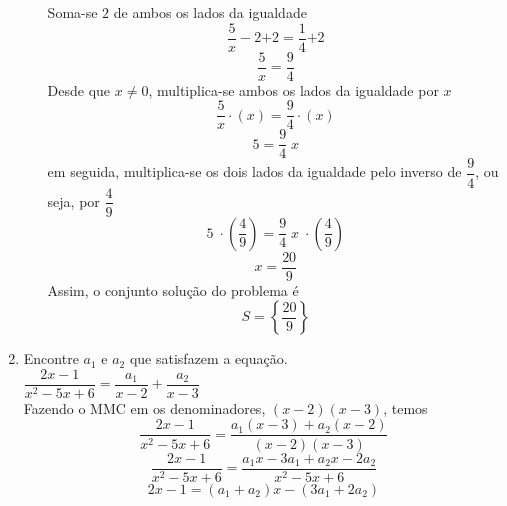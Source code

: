\begin{enumerate}
\begin{enumerate}
   \begin{center}
    \end{center}
			
			Soma-se $2$ de ambos os lados da igualdade
			\[
			\dfrac{5}{x}-2 {+2} = \dfrac{1}{4} {+2}
			\]
			\[
			\dfrac{5}{x} = \dfrac{9}{4}
			\]
			Desde que $x \neq 0$, multiplica-se ambos os lados da igualdade por $x$
			\[
			\dfrac{5}{x} \cdot (x)  = \dfrac{9}{4} \cdot (x)
			\]
			\[
			5= \dfrac{9}{4}\; x
			\]
			em seguida, multiplica-se os dois lados da igualdade pelo inverso de $\dfrac{9}{4}$, ou seja, por $\dfrac{4}{9}$
			\[
			5\; \cdot \left(\dfrac{4}{9}\right)= \dfrac{9}{4}\; x \;\cdot \left(\dfrac{4}{9}\right)
			\]
			\[
			x = \dfrac{20}{9}
			\]
			Assim, o conjunto solução do problema é
			\[
			S=\left\{ \dfrac{20}{9} \right\}
			\]
		\end{enumerate}

		\item Encontre $a_1$ e $a_2$ que satisfazem a equação.\\
		$\dfrac{2x-1}{x^2-5x+6} = \dfrac{a_1}{x-2}+\dfrac{a_2}{x-3}$\\
   
			Fazendo o MMC em os denominadores, $(x-2)(x-3)$, temos
			\[
			\dfrac{2x-1}{x^2-5x+6} = \dfrac{a_1(x-3)+a_2(x-2)}{(x-2)(x-3)}
			\]
			\[
			\dfrac{2x-1}{x^2-5x+6} = \dfrac{a_1 x-3a_1+a_2 x-2a_2}{x^2-5x+6}
			\]
			\[
			2x-1 = (a_1+a_2)x-(3a_1+2a_2)
			\]
   

\end{enumerate}
